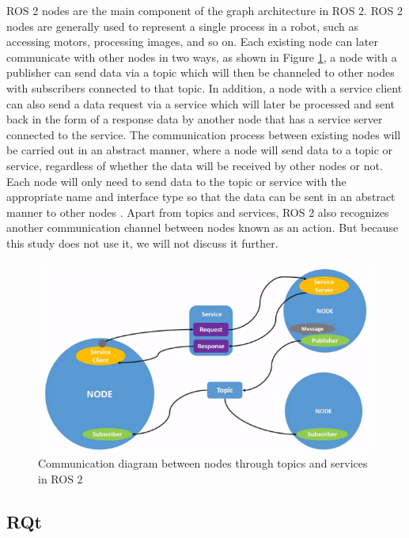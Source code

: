 ROS 2 nodes are the main component of the graph architecture in ROS 2. ROS 2 nodes are generally used to represent a single process in a robot, such as accessing motors, processing images, and so on. Each existing node can later communicate with other nodes in two ways, as shown in Figure \ref{fig:ros2node}, a node with a publisher can send data via a topic which will then be channeled to other nodes with subscribers connected to that topic.
In addition, a node with a service client can also send a data request via a service which will later be processed and sent back in the form of a response data by another node that has a service server connected to the service.
The communication process between existing nodes will be carried out in an abstract manner, where a node will send data to a topic or service, regardless of whether the data will be received by other nodes or not. Each node will only need to send data to the topic or service with the appropriate name and interface type so that the data can be sent in an abstract manner to other nodes \parencite{fikri2021}.
Apart from topics and services, ROS 2 also recognizes another communication channel between nodes known as an action. But because this study does not use it, we will not discuss it further.
\begin{figure}[ht]
  \centering
  \includegraphics[scale=1]{gambar/ros2_node.png}
  \caption{Communication diagram between nodes through topics and services in ROS 2}
  \label{fig:ros2node}
\end{figure}

\subsection{RQt}
\label{subsec:rqt}

